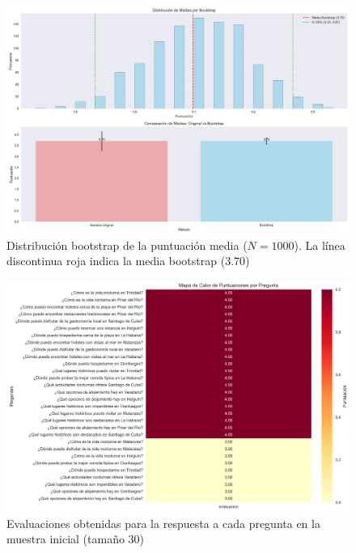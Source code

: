 \documentclass[10pt]{llncs}
\begin{document}
\begin{figure}
\centering
\includegraphics[width=1\textwidth]{../src/experiments/one_only_agent/bootstrap_distribution_20250617-171514.png}
\caption{Distribución bootstrap de la puntuación media ($N=1000$). La línea discontinua roja indica la media bootstrap (3.70)}
\label{fig:boot_dist_1}
\end{figure}

\begin{figure}
\centering
\includegraphics[width=1\textwidth]{../src/experiments/one_only_agent/quality_heatmap_20250617-171514.png}
\caption{Evaluaciones obtenidas para la respuesta a cada pregunta en la muestra inicial (tamaño 30)}
\label{fig:eval_1}
\end{figure}
\end{document}
